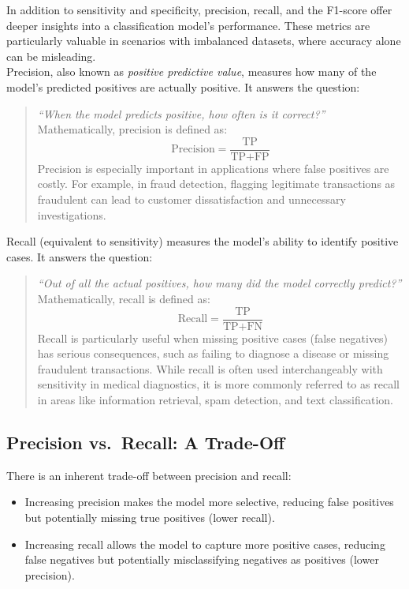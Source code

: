 \documentclass[
]{book}
\providecommand{\tightlist}{%
  \setlength{\itemsep}{0pt}\setlength{\parskip}{0pt}}
\theoremstyle{definition}
\theoremstyle{definition}
\theoremstyle{definition}
\theoremstyle{definition}
\theoremstyle{remark}
\begin{document}
In addition to sensitivity and specificity, precision, recall, and the F1-score offer deeper insights into a classification model's performance. These metrics are particularly valuable in scenarios with imbalanced datasets, where accuracy alone can be misleading.\\
Precision, also known as \emph{positive predictive value}, measures how many of the model's predicted positives are actually positive. It answers the question:

\begin{quote}
\emph{``When the model predicts positive, how often is it correct?''}\\
Mathematically, precision is defined as:\\
\[
\text{Precision} = \frac{\text{TP}}{\text{TP} + \text{FP}}
\]
Precision is especially important in applications where false positives are costly. For example, in fraud detection, flagging legitimate transactions as fraudulent can lead to customer dissatisfaction and unnecessary investigations.
\end{quote}

Recall (equivalent to sensitivity) measures the model's ability to identify positive cases. It answers the question:

\begin{quote}
\emph{``Out of all the actual positives, how many did the model correctly predict?''}\\
Mathematically, recall is defined as:\\
\[
\text{Recall} = \frac{\text{TP}}{\text{TP} + \text{FN}}
\]
Recall is particularly useful when missing positive cases (false negatives) has serious consequences, such as failing to diagnose a disease or missing fraudulent transactions. While recall is often used interchangeably with sensitivity in medical diagnostics, it is more commonly referred to as recall in areas like information retrieval, spam detection, and text classification.
\end{quote}

\subsection*{Precision vs.~Recall: A Trade-Off}\label{precision-vs.-recall-a-trade-off}

There is an inherent trade-off between precision and recall:

\begin{itemize}
\tightlist
\item
  Increasing precision makes the model more selective, reducing false positives but potentially missing true positives (lower recall).\\
\item
  Increasing recall allows the model to capture more positive cases, reducing false negatives but potentially misclassifying negatives as positives (lower precision).
\end{itemize}
\end{document}
